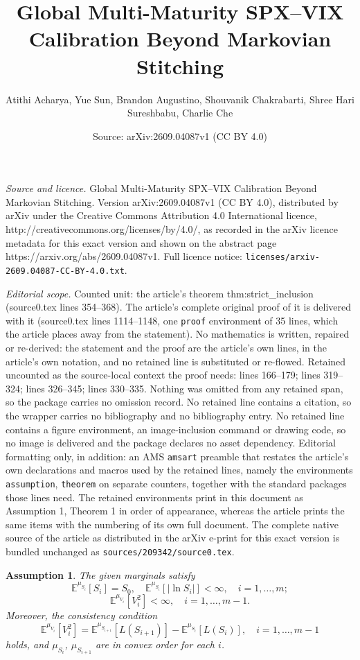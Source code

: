 \documentclass[10pt,a4paper]{amsart}
\title{Global Multi-Maturity SPX--VIX Calibration Beyond Markovian Stitching}
\author{Atithi Acharya, Yue Sun, Brandon Augustino, Shouvanik Chakrabarti, Shree Hari Sureshbabu, Charlie Che}
\date{Source: arXiv:2609.04087v1 (CC BY 4.0)}
\newtheorem{assumption}{Assumption}
\newcommand{\Embb}{\mathbb{E}}
\begin{document}
\maketitle

\noindent\emph{Source and licence.} Global Multi-Maturity SPX--VIX Calibration Beyond Markovian Stitching. Version arXiv:2609.04087v1 (CC BY 4.0), distributed by arXiv under the Creative Commons Attribution 4.0 International licence, http://creativecommons.org/licenses/by/4.0/, as recorded in the arXiv licence metadata for this exact version and shown on the abstract page https://arxiv.org/abs/2609.04087v1. Full licence notice: \texttt{licenses/arxiv-2609.04087-CC-BY-4.0.txt}.\par\smallskip

\noindent\textit{Editorial scope.} Counted unit: the article's theorem thm:strict\_inclusion (source0.tex lines 354--368). The article's complete original proof of it is delivered with it (source0.tex lines 1114--1148, one \texttt{proof} environment of 35 lines, which the article places away from the statement). No mathematics is written, repaired or re-derived: the statement and the proof are the article's own lines, in the article's own notation, and no retained line is substituted or re-flowed.  Retained uncounted as the source-local context the proof needs: lines 166--179; lines 319--324; lines 326--345; lines 330--335.  Nothing was omitted from any retained span, so the package carries no omission record.  No retained line contains a citation, so the wrapper carries no bibliography and no bibliography entry.  No retained line contains a figure environment, an image-inclusion command or drawing code, so no image is delivered and the package declares no asset dependency.  Editorial formatting only, in addition: an AMS \texttt{amsart} preamble that restates the article's own declarations and macros used by the retained lines, namely the environments \texttt{assumption}, \texttt{theorem} on separate counters, together with the standard packages those lines need.  The retained environments print in this document as Assumption 1, Theorem 1 in order of appearance, whereas the article prints the same items with the numbering of its own full document.  The complete native source of the article as distributed in the arXiv e-print for this exact version is bundled unchanged as \texttt{sources/209342/source0.tex}.
\begin{assumption}\label{ass:marginals}
The given marginals satisfy
\begin{equation}
    \Embb^{\mu_{S_i}}[S_i] = S_0, \quad \Embb^{\mu_{S_i}}[|\ln S_i|] < \infty, \quad i = 1, \ldots, m;
\end{equation}
\begin{equation}
    \Embb^{\mu_{V_i}}[V_i^2] < \infty, \quad i = 1, \ldots, m-1.
\end{equation}
Moreover, the consistency condition
\begin{equation}\label{eq:consistency_global}
    \Embb^{\mu_{V_i}}[V_i^2] = \Embb^{\mu_{S_{i+1}}}[L(S_{i+1})] - \Embb^{\mu_{S_i}}[L(S_i)], \quad i = 1, \ldots, m-1
\end{equation}
holds, and $\mu_{S_i}$, $\mu_{S_{i+1}}$ are in convex order for each $i$.
\end{assumption}
\end{document}
